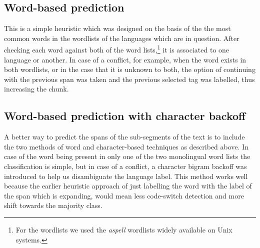 \documentclass[11pt]{article}
\begin{document}
\subsection{Word-based prediction}
\label{wbased}

This is a simple heuristic which was designed on the basis of the the most common words in the wordlists of the languages 
which are in question. After checking each word against both of the word lists,\footnote{For the wordlists we used the \emph{aspell}
wordlists widely available on Unix systems.} it is associated to one language or another. In 
case of a conflict, for example, when the word exists in both wordlists, or in the case that it is unknown to both, the option 
of continuing with the previous span was taken and the previous selected tag was labelled, thus increasing the chunk. 

\subsection{Word-based prediction with character backoff}
\label{wbasedbackoff}

A better way to predict the spans of the sub-segments of the text is to include the two methods of word and character-based techniques 
as described above. In case of the word being present in only one of the two monolingual word lists the classification is simple, 
but in case of a conflict, a character bigram backoff was introduced to help us disambiguate the language label. This method works well because the earlier heuristic approach of just labelling the word with the label of the span which is expanding, would mean less code-switch detection and more shift towards the majority class. 




%
%
\end{document}
